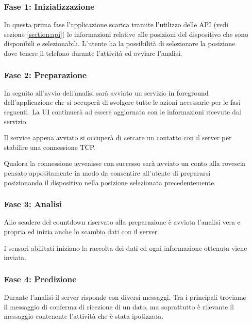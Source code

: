 \subsubsection{Fase 1: Inizializzazione}
In questa prima fase l'applicazione scarica tramite l'utilizzo delle API (vedi sezione \ref{section:api}) le informazioni relative
alle posizioni del dispositivo che sono disponibili e selezionabili.
L'utente ha la possibilità di selezionare la posizione dove tenere il telefono durante l'attività ed avviare l'analisi.

\subsubsection{Fase 2: Preparazione}
In seguito all'avvio dell'analisi sarà avviato un servizio in foreground \cite{services} dell'applicazione che si occuperà di svolgere tutte le azioni 
necessarie per le fasi seguenti. La UI continuerà ad essere aggiornata con le informazioni ricevute dal servizio.

Il service appena avviato si occuperà di cercare un contatto con il server per stabilire una connessione TCP.

Qualora la connessione avvenisse con successo sarà avviato un conto alla rovescia pensato appositamente in modo da consentire all'utente 
di prepararsi posizionando il dispositivo nella posizione selezionata precedentemente.

\subsubsection{Fase 3: Analisi}
Allo scadere del countdown riservato alla preparazione è avviata l'analisi vera e propria ed inizia anche lo scambio dati con il server.

I sensori abilitati iniziano la raccolta dei dati ed ogni informazione ottenuta viene inviata.

\subsubsection{Fase 4: Predizione}
Durante l'analisi il server risponde con diversi messaggi. Tra i principali troviamo il messaggio di conferma di ricezione di un dato, 
ma soprattutto è rilevante il messaggio contenente l'attività che è stata ipotizzata.

